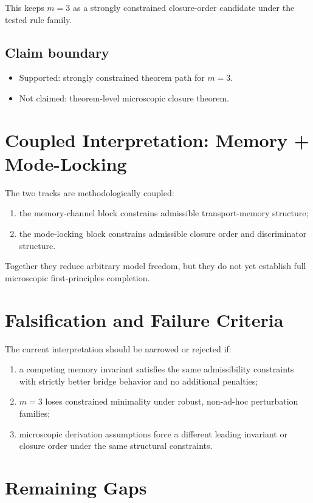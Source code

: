 \documentclass[11pt,a4paper]{article}
\begin{document}
This keeps \(m=3\) as a strongly constrained closure-order candidate under the tested rule family.

\subsection{Claim boundary}

\begin{itemize}
  \item Supported: strongly constrained theorem path for \(m=3\).
  \item Not claimed: theorem-level microscopic closure theorem.
\end{itemize}

\section{Coupled Interpretation: Memory + Mode-Locking}

The two tracks are methodologically coupled:
\begin{enumerate}
  \item the memory-channel block constrains admissible transport-memory structure;
  \item the mode-locking block constrains admissible closure order and discriminator structure.
\end{enumerate}

Together they reduce arbitrary model freedom, but they do not yet establish full microscopic first-principles completion.

\section{Falsification and Failure Criteria}

The current interpretation should be narrowed or rejected if:
\begin{enumerate}
  \item a competing memory invariant satisfies the same admissibility constraints with strictly better bridge behavior and no additional penalties;
  \item \(m=3\) loses constrained minimality under robust, non-ad-hoc perturbation families;
  \item microscopic derivation assumptions force a different leading invariant or closure order under the same structural constraints.
\end{enumerate}

\section{Remaining Gaps}
\end{document}
